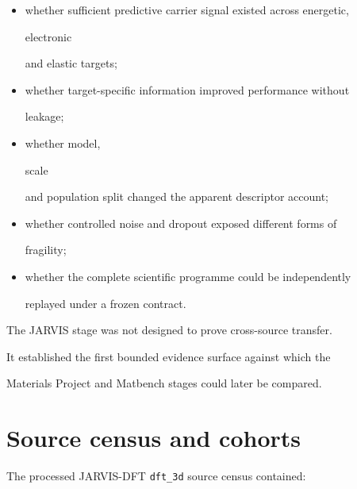 \documentclass[11pt,a4paper,oneside]{report}
\begin{document}
\begin{itemize}



\item

whether sufficient predictive carrier signal existed across energetic,

electronic

and elastic targets;



\item

whether target-specific information improved performance without

leakage;



\item

whether model,

scale

and population split changed the apparent descriptor account;



\item

whether controlled noise and dropout exposed different forms of

fragility;



\item

whether the complete scientific programme could be independently

replayed under a frozen contract.



\end{itemize}



The JARVIS stage was not designed to prove cross-source transfer.



It established the first bounded evidence surface against which the

Materials Project and Matbench stages could later be compared.





\section{Source census and cohorts}



The processed JARVIS-DFT \texttt{dft\_3d} source census contained:
\end{document}
